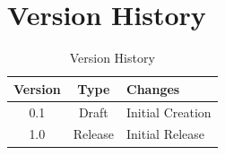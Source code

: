 \chapter{Version History}

\begin{table}[h]
\centering
\begin{tabularx}{\textwidth}{|c|c|X|}
\hline
\textbf{Version} & \textbf{Type} & \textbf{Changes} \\
\hline
0.1 & Draft & Initial Creation \\
\hline
1.0 & Release & Initial Release \\
\hline
\end{tabularx}%
\caption{Version History}
\label{my-label}
\end{table}